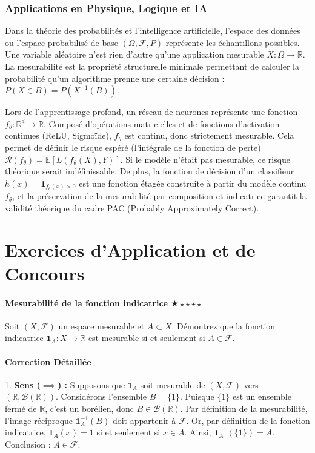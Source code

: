 \documentclass[11pt,a4paper]{article}
\begin{document}
\section{Applications en Physique, Logique et IA}

Dans la théorie des probabilités et l'intelligence artificielle, l'espace des données ou l'espace probabilisé de base $(\Omega, \mathcal{F}, P)$ représente les échantillons possibles.
Une variable aléatoire n'est rien d'autre qu'une application mesurable $X : \Omega \to \mathbb{R}$. La mesurabilité est la propriété structurelle minimale permettant de calculer la probabilité qu'un algorithme prenne une certaine décision : $P(X \in B) = P(X^{-1}(B))$.

Lors de l'apprentissage profond, un réseau de neurones représente une fonction $f_{\theta} : \mathbb{R}^d \to \mathbb{R}$. Composé d'opérations matricielles et de fonctions d'activation continues (ReLU, Sigmoïde), $f_{\theta}$ est continu, donc strictement mesurable. Cela permet de définir le risque espéré (l'intégrale de la fonction de perte) $\mathcal{R}(f_{\theta}) = \mathbb{E}[L(f_{\theta}(X), Y)]$. Si le modèle n'était pas mesurable, ce risque théorique serait indéfinissable. De plus, la fonction de décision d'un classifieur $h(x) = \mathbf{1}_{f_{\theta}(x) > 0}$ est une fonction étagée construite à partir du modèle continu $f_{\theta}$, et la préservation de la mesurabilité par composition et indicatrice garantit la validité théorique du cadre PAC (Probably Approximately Correct).


\newpage
\part{Exercices d'Application et de Concours}
\subsection*{Mesurabilité de la fonction indicatrice \quad $\bigstar\star\star\star\star$}

Soit $(X, \mathcal{F})$ un espace mesurable et $A \subset X$. Démontrez que la fonction indicatrice $\mathbf{1}_A : X \to \mathbb{R}$ est mesurable si et seulement si $A \in \mathcal{F}$.

\subsection*{Correction Détaillée}

1. \textbf{Sens ($\implies$) :}
   Supposons que $\mathbf{1}_A$ soit mesurable de $(X, \mathcal{F})$ vers $(\mathbb{R}, \mathcal{B}(\mathbb{R}))$.
   Considérons l'ensemble $B = \{1\}$. Puisque $\{1\}$ est un ensemble fermé de $\mathbb{R}$, c'est un borélien, donc $B \in \mathcal{B}(\mathbb{R})$.
   Par définition de la mesurabilité, l'image réciproque $\mathbf{1}_A^{-1}(B)$ doit appartenir à $\mathcal{F}$.
   Or, par définition de la fonction indicatrice, $\mathbf{1}_A(x) = 1$ si et seulement si $x \in A$.
   Ainsi, $\mathbf{1}_A^{-1}(\{1\}) = A$.
   Conclusion : $A \in \mathcal{F}$.
\end{document}
